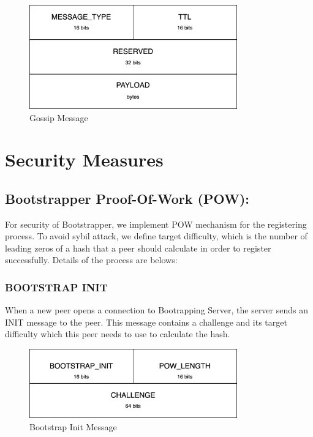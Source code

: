 \begin{figure}[H]
    \centering
    \includegraphics[width=0.8\textwidth]{pics/gossip.message.png}
    \caption{Gossip Message}
\end{figure}



\section{Security Measures}

\subsection{Bootstrapper Proof-Of-Work (POW):}

For security of Bootstrapper, we implement POW mechanism for the registering process. To avoid sybil attack, we define target difficulty, which is the number of leading zeros of a hash that a peer should calculate in order to register successfully. Details of the process are belows:

\subsubsection{BOOTSTRAP INIT}

When a new peer opens a connection to Bootrapping Server, the server sends an INIT message to the peer. This message contains a challenge and its target difficulty which this peer needs to use to calculate the hash.

\begin{figure}[H]
    \centering
    \includegraphics[width=0.8\textwidth]{pics/bootstrap.init.png}
    \caption{Bootstrap Init Message}
\end{figure}

